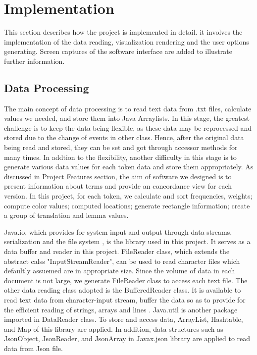 \clearpage
\section{Implementation}
This section describes how the project is implemented in detail. it involves the implementation of the data reading, visualization rendering and the user options generating. Screen captures of the software interface are added to illustrate further information.

\subsection{Data Processing}

The main concept of data processing is to read text data from .txt files, calculate values we needed, and store them into Java Arraylists. In this stage, the greatest challenge is to keep the data being flexible, as these data may be reprocessed and stored due to the change of events in other class. Hence, after the original data being read and stored, they can be set and got through accessor methods \cite{Bob's coding convention} for many times. In addtion to the flexibility, another difficulty in this stage is to generate various data values for each token data and store them appropriately. As discussed in Project Features section, the aim of software we designed is to present information about terms and provide an concordance view for each version. In this project, for each token, we calculate and sort frequencies, weights; compute color values; computed locations; generate rectangle information; create a group of translation and lemma values.

Java.io, which provides for system input and output through data streams, serialization and the file system \cite{javadoc java.io}, is the library used in this project. It serves as a data buffer and reader in this project. FileReader class, which extends the abstract calss "InputStreamReader", can be used to read character files which defaultly assuemed are in appropriate size. Since the volume of data in each document is not large, we generate FileReader class to access each text file. The other data reading class adopted is the BufferedReader class. It is available to read text data from character-input stream, buffer the data so as to provide for the efficient reading of strings, arrays and lines \cite{javadoc7}. Java.util is another package imported in DataReader class. To store and access data, ArrayList, Hashtable, and Map of this library are applied. In addition, data structures such as JsonObject, JsonReader, and JsonArray in Javax.json library are applied to read data from Json file.

